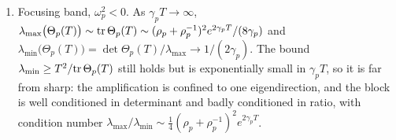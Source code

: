 \begin{lemma}
\begin{enumerate}[label=(\roman*),nosep,leftmargin=2.2em]
\[\begin{gathered}
\end{gathered}
\]
\item Focusing band, $\omega_p^2<0$. As $\gamma_pT\to\infty$, $\lambda_{\max}\big(\Theta_p(T)\big)\sim\mathrm{tr}\,\Theta_p(T)\sim(\rho_p+\rho_p^{-1})^2e^{2\gamma_pT}/(8\gamma_p)$ and $\lambda_{\min}\big(\Theta_p(T)\big)=\det\Theta_p(T)/\lambda_{\max}\to1/(2\gamma_p)$. The bound $\lambda_{\min}\ge T^2/\mathrm{tr}\,\Theta_p(T)$ still holds but is exponentially small in $\gamma_pT$, so it is far from sharp: the amplification is confined to one eigendirection, and the block is well conditioned in determinant and badly conditioned in ratio, with condition number $\lambda_{\max}/\lambda_{\min}\sim\frac14(\rho_p+\rho_p^{-1})^2e^{2\gamma_pT}$.
\end{enumerate}
\end{lemma}

